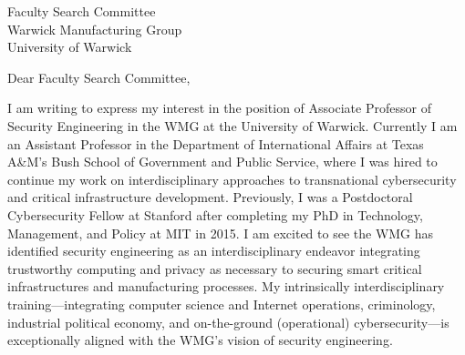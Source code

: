 \documentclass[11pt]{letter}
\begin{document}
\begin{letter}{ Faculty Search Committee \\
                Warwick Manufacturing Group \\
                University of Warwick                 
              }
\vspace{-2 \baselineskip}
\opening{Dear Faculty Search Committee,}




I am writing to express my interest in the position of Associate Professor of Security Engineering in the WMG at the University of Warwick. 
%
Currently I am an Assistant Professor in the
Department of International Affairs at Texas A\&M's Bush School of
Government and Public Service, where I was hired to continue my work on  interdisciplinary approaches to transnational cybersecurity and critical infrastructure development.
%
Previously, I was a Postdoctoral Cybersecurity Fellow at Stanford after completing my PhD in Technology, Management, and Policy at MIT in 2015.
%
I am excited to see the WMG has identified security engineering as an  interdisciplinary endeavor integrating trustworthy computing and privacy as necessary to securing smart critical infrastructures and manufacturing processes.
%
My intrinsically interdisciplinary training---integrating computer science and Internet operations, criminology, industrial political economy, and on-the-ground (operational) cybersecurity---is exceptionally aligned with the WMG's vision of security engineering.


\end{letter}
\end{document}
